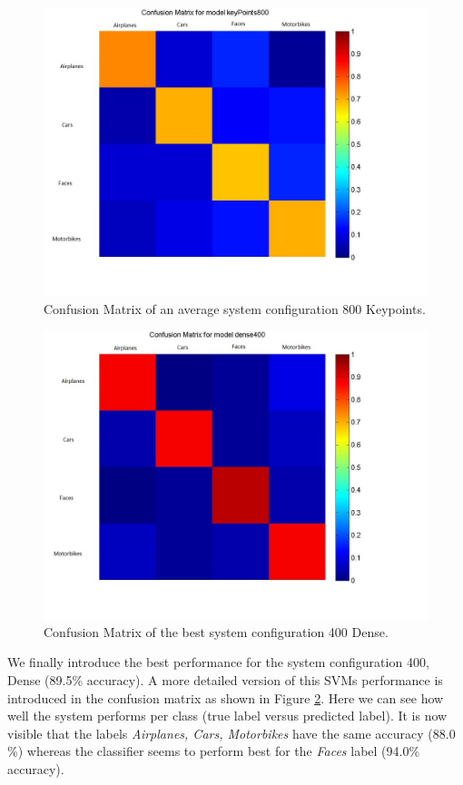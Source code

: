 \documentclass[11pt]{article}
\begin{document}
\begin{figure}[h!]
\centering
\includegraphics[scale=0.40]{averageConf.jpg}
\caption{Confusion Matrix of an average system configuration 800 Keypoints.}
\label{averageConf}
\end{figure}

\begin{figure}[h!]
\centering
\includegraphics[scale=0.40]{bestConf.jpg}
\caption{Confusion Matrix of the best system configuration 400 Dense.}
\label{bestConf}
\end{figure}

We finally introduce the best performance for the system configuration 400, Dense (89.5\% accuracy). A more detailed version of this SVMs performance is introduced in the confusion matrix as shown in Figure \ref{bestConf}. Here we can see how well the system performs per class (true label versus predicted label). It is now visible that the labels \emph{Airplanes, Cars, Motorbikes} have the same accuracy (88.0 \%) whereas the classifier seems to perform best for the \emph{Faces} label (94.0\% accuracy).
\end{document}
